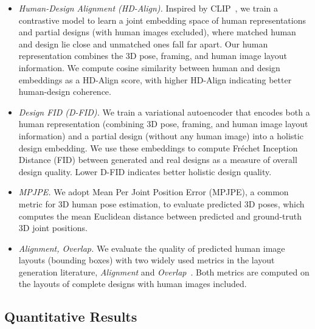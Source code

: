 \begin{itemize}
    \item \textit{Human-Design Alignment (HD-Align).} Inspired by CLIP~\cite{clip}, we train a contrastive model to learn a joint embedding space of human representations and partial designs (with human images excluded), where matched human and design lie close and unmatched ones fall far apart. 
    Our human representation combines the 3D pose, framing, and human image layout information.
    We compute cosine similarity between human and design embeddings as a HD-Align score, with higher HD-Align indicating better human-design coherence.
    \item \textit{Design FID (D-FID).} We train a variational autoencoder that encodes both a human representation (combining 3D pose, framing, and human image layout information) and a partial design (without any human image) into a holistic design embedding. We use these embeddings to compute Fr\'{e}chet Inception Distance (FID) between generated and real designs as a measure of overall design quality. Lower D-FID indicates better holistic design quality.
    \item \textit{MPJPE.} We adopt Mean Per Joint Position Error (MPJPE), a common metric for 3D human pose estimation, 
    to evaluate predicted 3D poses,
    which computes the mean Euclidean distance between predicted and ground-truth 3D joint positions.
    \item \textit{Alignment, Overlap.} We evaluate the quality of predicted human image layouts (bounding boxes) with two widely used metrics in the layout generation literature, \textit{Alignment} and \textit{Overlap}~\cite{LayoutGAN}. Both metrics are computed on the layouts of complete designs with human images included. 
\end{itemize}

\subsection{Quantitative Results}

\begin{table}[t]
\centering
\caption{Quantitative evaluation results of different methods. The best results are in bold, while the second best results are underlined.}
\label{tab:quantitative_results}
\end{table}

